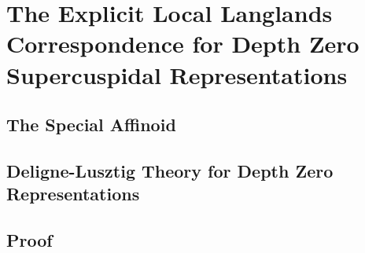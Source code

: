 \documentclass[../main.tex]{subfiles}
\begin{document}
\section{The Explicit Local Langlands Correspondence for Depth Zero Supercuspidal Representations} %
\label{sec:The Explicit Local Langlands Correspondence for Depth Zero Supercuspidal Representations}

\subsection{The Special Affinoid} %
\label{sub:The Special Affinoid}


\subsection{Deligne-Lusztig Theory for Depth Zero Representations} %
\label{sub:Deligne-Lusztig Theory for Depth Zero Representations}


\subsection{Proof} %
\label{sub:Proof}


\end{document}
